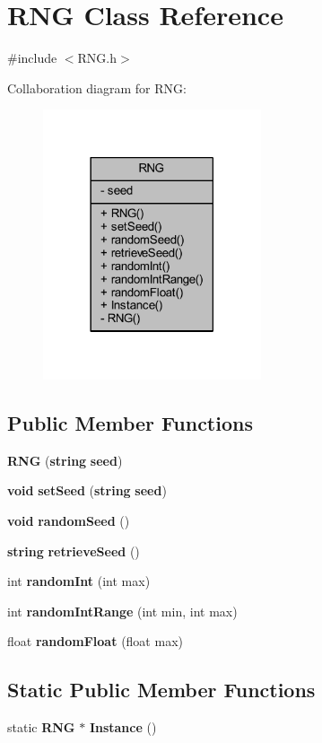 \section{R\+N\+G Class Reference}
\label{class_r_n_g}


{\ttfamily \#include $<$R\+N\+G.\+h$>$}



Collaboration diagram for R\+N\+G\+:\nopagebreak
\begin{figure}[H]
\begin{center}
\leavevmode
\includegraphics[width=182pt]{de/d2c/class_r_n_g__coll__graph}
\end{center}
\end{figure}
\subsection*{Public Member Functions}
\begin{DoxyCompactItemize}
\item 
{\bf R\+N\+G} ({\bf string} {\bf seed})
\item 
{\bf void} {\bf set\+Seed} ({\bf string} {\bf seed})
\item 
{\bf void} {\bf random\+Seed} ()
\item 
{\bf string} {\bf retrieve\+Seed} ()
\item 
int {\bf random\+Int} (int max)
\item 
int {\bf random\+Int\+Range} (int min, int max)
\item 
float {\bf random\+Float} (float max)
\end{DoxyCompactItemize}
\subsection*{Static Public Member Functions}
\begin{DoxyCompactItemize}
\item 
static {\bf R\+N\+G} $\ast$ {\bf Instance} ()
\end{DoxyCompactItemize}
